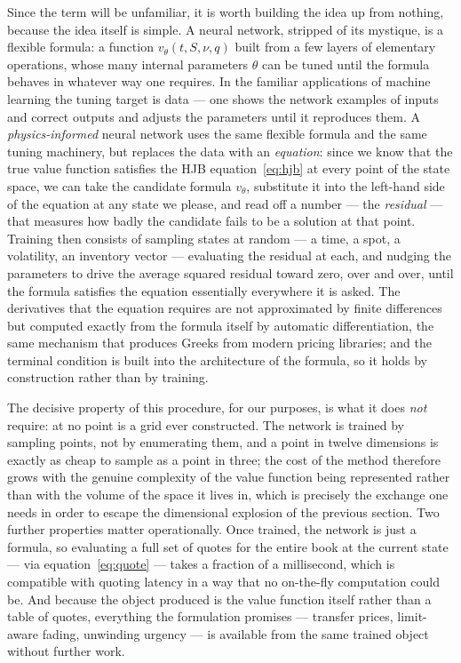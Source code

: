 \documentclass[11pt,a4paper]{article}
\begin{document}
Since the term will be unfamiliar, it is worth building the idea up from
nothing, because the idea itself is simple. A neural network, stripped
of its mystique, is a flexible formula: a function $v_\theta(t,S,\nu,q)$
built from a few layers of elementary operations, whose many internal
parameters $\theta$ can be tuned until the formula behaves in whatever
way one requires. In the familiar applications of machine learning the
tuning target is data --- one shows the network examples of inputs and
correct outputs and adjusts the parameters until it reproduces them. A
\emph{physics-informed} neural network uses the same flexible formula
and the same tuning machinery, but replaces the data with an
\emph{equation}: since we know that the true value function satisfies
the HJB equation~\eqref{eq:hjb} at every point of the state space, we
can take the candidate formula $v_\theta$, substitute it into the
left-hand side of the equation at any state we please, and read off a
number --- the \emph{residual} --- that measures how badly the candidate
fails to be a solution at that point. Training then consists of sampling
states at random --- a time, a spot, a volatility, an inventory vector
--- evaluating the residual at each, and nudging the parameters to drive
the average squared residual toward zero, over and over, until the
formula satisfies the equation essentially everywhere it is asked. The
derivatives that the equation requires are not approximated by finite
differences but computed exactly from the formula itself by automatic
differentiation, the same mechanism that produces Greeks from modern
pricing libraries; and the terminal condition is built into the
architecture of the formula, so it holds by construction rather than by
training.

The decisive property of this procedure, for our purposes, is what it
does \emph{not} require: at no point is a grid ever constructed. The
network is trained by sampling points, not by enumerating them, and a
point in twelve dimensions is exactly as cheap to sample as a point in
three; the cost of the method therefore grows with the genuine
complexity of the value function being represented rather than with the
volume of the space it lives in, which is precisely the exchange one
needs in order to escape the dimensional explosion of
the previous section. Two further properties matter operationally. Once
trained, the network is just a formula, so evaluating a full set of
quotes for the entire book at the current state --- via
equation~\eqref{eq:quote} --- takes a fraction of a millisecond, which
is compatible with quoting latency in a way that no on-the-fly
computation could be. And because the object produced is the value
function itself rather than a table of quotes, everything the
formulation promises --- transfer prices, limit-aware fading, unwinding
urgency --- is available from the same trained object without further
work.
\end{document}
